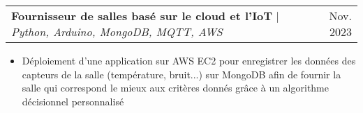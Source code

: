 \documentclass[letterpaper,10.5t]{article}
\makeatletter
\newcommand{\resumeItem}[1]{
  \item\small{
    {#1 \vspace{-2pt}}
  }
}
\newcommand{\resumeProjectHeading}[2]{
    \item
    \begin{tabular*}{0.97\textwidth}{l@{\extracolsep{\fill}}r}
      \small#1 & #2 \\
    \end{tabular*}\vspace{-7pt}
}
\newcommand{\resumeItemListStart}{\begin{itemize}}
\newcommand{\resumeItemListEnd}{\end{itemize}\vspace{-5pt}}
\makeatother
\begin{document}
        \resumeProjectHeading
        {\textbf{Fournisseur de salles basé sur le cloud et l'IoT} $|$ \emph{Python, Arduino, MongoDB, MQTT, AWS}}{Nov. 2023}
            \resumeItemListStart
                \resumeItem{Déploiement d'une application sur AWS EC2 pour enregistrer les données des capteurs de la salle (température, bruit...) sur MongoDB afin de fournir la salle qui correspond le mieux aux critères donnés grâce à un algorithme décisionnel personnalisé}
            \resumeItemListEnd

          

\end{document}
